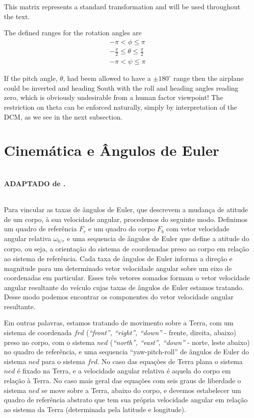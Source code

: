 This matrix represents a standard transformation and will be used
throughout the text.

The defined ranges for the rotation angles are
\begin{align*}
    -\pi  < \phi \leq \pi \\
    -\frac{\pi}{2} \leq \theta \leq \frac{\pi}{2} \\
    -\pi < \psi \leq \pi
\end{align*}

If the pitch angle, \( \theta \), had beem allowed to have a \( \pm
180^{\circ} \) range then the airplane could be inverted and
heading South with the roll and heading angles reading zero, which
is obviously undesirable from a human factor viewpoint! The
restriction on theta can be enforced naturally, simply by
interpretation of the DCM, as we see in the next subsection.

\section{Cinemática e Ângulos de Euler}
\\

\textbf{ADAPTADO de .}

\\
Para vincular as taxas de ângulos de Euler, que descrevem a mudança de atitude
de um corpo, à sua velocidade angular, procedemos do seguinte modo. Definimos
um quadro de referência \(F_{r}\) e um quadro do corpo \(F_{b}\) com vetor
velocidade angular relativa \(\omega_{b/r}\) e uma sequencia de ângulos de Euler
que define a atitude do corpo, ou seja, a orientação do sistema de coordenadas preso
ao corpo em relação ao sistema de referência. Cada taxa de ângulos de Euler
informa a direção e magnitude para um determinado vetor velocidade angular
sobre um eixo de coordenadas em particular. Esses três vetores somados formam o
vetor velocidade angular resultante do veículo cujas taxas de ângulos de Euler
estamos tratando. Desse modo podemos encontrar os componentes do vetor
velocidade angular resultante.

Em outras palavras, estamos tratando de movimento sobre a Terra, com um sistema de
coordenada \(frd\) (\emph{``front'', ``right'', ``down''} - frente, direita,
abaixo) preso no corpo, com o sistema \(ned\) (\emph{``north'', ``east'', ``down''}
- norte, leste abaixo) no quadro de referência, e uma sequencia
``yaw-pitch-roll'' de ângulos de Euler do sistema \(ned\) para o sistema
\(frd\). No caso das equações de Terra plana o sistema \(ned\) é fixado na
Terra, e a velocidade angular relativa é aquela do corpo em relação à Terra. No
caso mais geral das equações com seis graus de liberdade o sistema \(ned\) se
move sobre a Terra, abaixo do corpo, e devemos estabelecer um quadro de
referência abstrato que tem sua própria velocidade angular em relação ao
sistema da Terra (determinada pela latitude e longitude).

